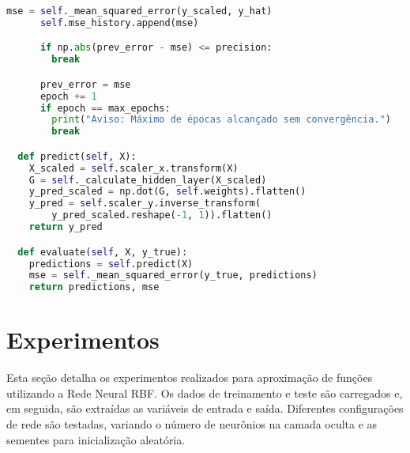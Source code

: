 \begin{lstlisting}[language=Python, caption={Classe RBFNetwork}]
      mse = self._mean_squared_error(y_scaled, y_hat)
      self.mse_history.append(mse)

      if np.abs(prev_error - mse) <= precision:
        break

      prev_error = mse
      epoch += 1
      if epoch == max_epochs:
        print("Aviso: Máximo de épocas alcançado sem convergência.")
        break

  def predict(self, X):
    X_scaled = self.scaler_x.transform(X)
    G = self._calculate_hidden_layer(X_scaled)
    y_pred_scaled = np.dot(G, self.weights).flatten()
    y_pred = self.scaler_y.inverse_transform(
        y_pred_scaled.reshape(-1, 1)).flatten()
    return y_pred

  def evaluate(self, X, y_true):
    predictions = self.predict(X)
    mse = self._mean_squared_error(y_true, predictions)
    return predictions, mse
\end{lstlisting}

\section{Experimentos}

Esta seção detalha os experimentos realizados para aproximação de funções utilizando a Rede Neural RBF. Os dados de treinamento e teste são carregados e, em seguida, são extraídas as variáveis de entrada e saída. Diferentes configurações de rede são testadas, variando o número de neurônios na camada oculta e as sementes para inicialização aleatória.

